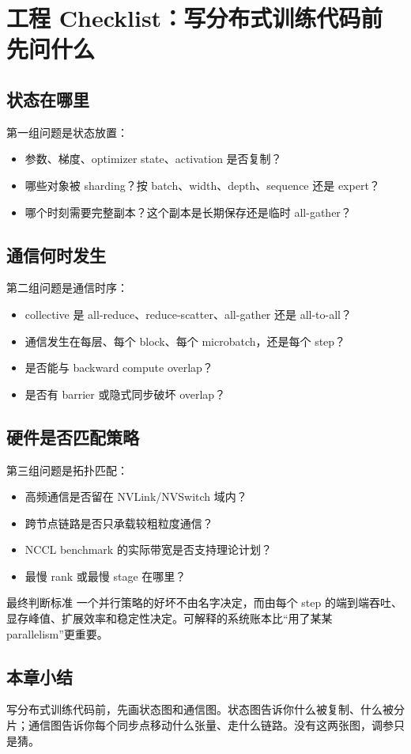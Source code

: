 \section{工程 Checklist：写分布式训练代码前先问什么}

\subsection{状态在哪里}

第一组问题是状态放置：

\begin{itemize}
    \item 参数、梯度、optimizer state、activation 是否复制？
    \item 哪些对象被 sharding？按 batch、width、depth、sequence 还是 expert？
    \item 哪个时刻需要完整副本？这个副本是长期保存还是临时 all-gather？
\end{itemize}

\subsection{通信何时发生}

第二组问题是通信时序：

\begin{itemize}
    \item collective 是 all-reduce、reduce-scatter、all-gather 还是 all-to-all？
    \item 通信发生在每层、每个 block、每个 microbatch，还是每个 step？
    \item 是否能与 backward compute overlap？
    \item 是否有 barrier 或隐式同步破坏 overlap？
\end{itemize}

\subsection{硬件是否匹配策略}

第三组问题是拓扑匹配：

\begin{itemize}
    \item 高频通信是否留在 NVLink/NVSwitch 域内？
    \item 跨节点链路是否只承载较粗粒度通信？
    \item NCCL benchmark 的实际带宽是否支持理论计划？
    \item 最慢 rank 或最慢 stage 在哪里？
\end{itemize}

\begin{importantbox}{最终判断标准}
一个并行策略的好坏不由名字决定，而由每个 step 的端到端吞吐、显存峰值、扩展效率和稳定性决定。可解释的系统账本比“用了某某 parallelism”更重要。
\end{importantbox}

\subsection{本章小结}

写分布式训练代码前，先画状态图和通信图。状态图告诉你什么被复制、什么被分片；通信图告诉你每个同步点移动什么张量、走什么链路。没有这两张图，调参只是猜。

